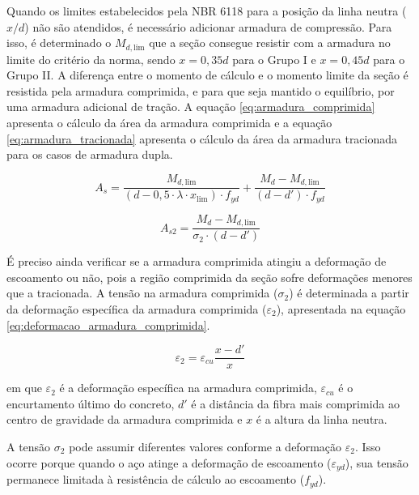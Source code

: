 Quando os limites estabelecidos pela NBR 6118  para a posição da linha neutra ($x/d$) não são atendidos, é necessário adicionar armadura de compressão. Para isso, é determinado o $M_{d,\mathrm{lim}}$ que a seção consegue resistir com a armadura no limite do critério da norma, sendo $x = 0{,}35d$ para o Grupo I e $x = 0{,}45d$ para o Grupo II. A diferença entre o momento de cálculo e o momento limite da seção é resistida pela armadura comprimida, e para que seja mantido o equilíbrio, por uma armadura adicional de tração. A equação \ref{eq:armadura_comprimida} apresenta o cálculo da área da armadura comprimida e a equação \ref{eq:armadura_tracionada} apresenta o cálculo da área da armadura tracionada para os casos de armadura dupla.

\begin{equation}
A_s = \frac{M_{d,\mathrm{lim}}}{(d - 0{,}5 \cdot \lambda \cdot x_{\mathrm{lim}}) \cdot f_{yd}} + \frac{M_d - M_{d,\mathrm{lim}}}{(d - d') \cdot f_{yd}}
\label{eq:armadura_tracionada}
\end{equation}

\begin{equation}
A_{s2} = \frac{M_d - M_{d,\mathrm{lim}}}{\sigma_2\cdot(d-d')}
\label{eq:armadura_comprimida}
\end{equation}

É preciso ainda verificar se a armadura comprimida atingiu a deformação de escoamento ou não, pois a região comprimida da seção sofre deformações menores que a tracionada. A tensão na armadura comprimida ($\sigma_2$) é determinada a partir da deformação específica da armadura comprimida ($\varepsilon_2$), apresentada na equação \ref{eq:deformacao_armadura_comprimida}.

\begin{equation}
\varepsilon_2=\varepsilon_{cu}\frac{x-d'}{x}
\label{eq:deformacao_armadura_comprimida}
\end{equation}

em que $\varepsilon_2$ é a deformação específica na armadura comprimida, $\varepsilon_{cu}$ é o encurtamento último do concreto, $d'$ é a distância da fibra mais comprimida ao centro de gravidade da armadura comprimida e $x$ é a altura da linha neutra.

A tensão $\sigma_2$ pode assumir diferentes valores conforme a deformação $\varepsilon_2$. Isso ocorre porque quando o aço atinge a deformação de escoamento ($\varepsilon_{yd}$), sua tensão permanece limitada à resistência de cálculo ao escoamento ($f_{yd}$).

